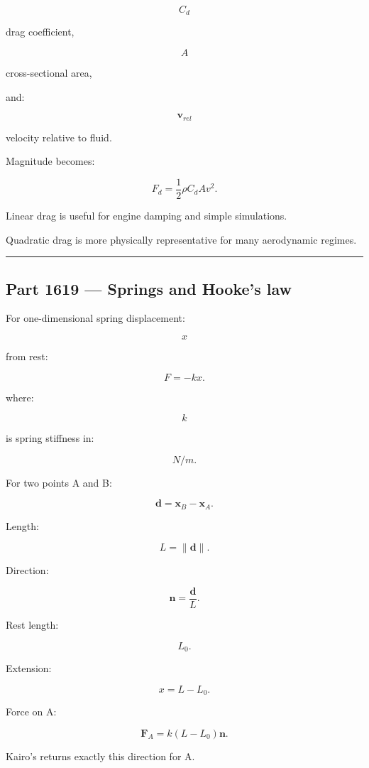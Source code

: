 \[
C_d
\]

drag coefficient,

\[
A
\]

cross-sectional area,

and:

\[
\mathbf{v}_{rel}
\]

velocity relative to fluid.

Magnitude becomes:

\[
F_d
=
\frac12\rho C_d A v^2.
\]

Linear drag is useful for engine damping and simple simulations.

Quadratic drag is more physically representative for many aerodynamic regimes.

\begin{center}\rule{0.5\linewidth}{0.5pt}\end{center}

\subsection{Part 1619 --- Springs and Hooke's law}\label{06-engine-ii-ch034-part-1619-springs-and-hookes-law}

\hypertarget{06-engine-ii-ch034-part-1619-springs-and-hookes-law}{}

For one-dimensional spring displacement:

\[
x
\]

from rest:

\[
\boxed{
F=-kx.
}
\]

where:

\[
k
\]

is spring stiffness in:

\[
N/m.
\]

For two points A and B:

\[
\mathbf{d}
=
\mathbf{x}_B-\mathbf{x}_A.
\]

Length:

\[
L=\|\mathbf{d}\|.
\]

Direction:

\[
\mathbf{n}
=
\frac{\mathbf{d}}{L}.
\]

Rest length:

\[
L_0.
\]

Extension:

\[
x=L-L_0.
\]

Force on A:

\[
\boxed{
\mathbf{F}_A
=
k(L-L_0)\mathbf{n}.
}
\]

Kairo's  returns exactly this direction for A.

